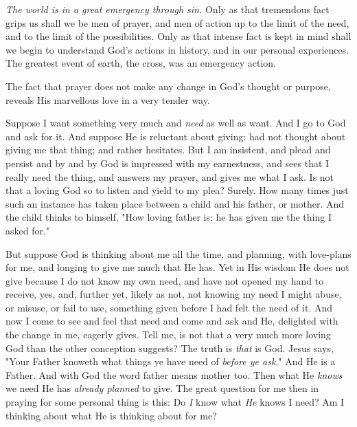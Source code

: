 \textit{The world is in a great emergency through sin.} Only as that tremendous
fact grips us shall we be men of prayer, and men of action up to the limit
of the need, and to the limit of the possibilities. Only as that intense
fact is kept in mind shall we begin to understand God's actions in
history, and in our personal experiences. The greatest event of earth, the
cross, was an emergency action.

The fact that prayer does not make any change in God's thought or
purpose, reveals His marvellous love in a very tender way.

Suppose I want something very much and \textit{need} as well as want. And I go to
God and ask for it. And suppose He is reluctant about giving: had not
thought about giving me that thing; and rather hesitates. But I am
insistent, and plead and persist and by and by God is impressed with my
earnestness, and sees that I really need the thing, and answers my prayer,
and gives me what I ask. Is not that a loving God so to listen and yield
to my plea? Surely. How many times just such an instance has taken place
between a child and his father, or mother. And the child thinks to
himself, "How loving father is; he has given me the thing I asked for."

But suppose God is thinking about me all the time, and planning, with
love-plans for me, and longing to give me much that He has. Yet in His
wisdom He does not give because I do not know my own need, and have not
opened my hand to receive, yes, and, further yet, likely as not, not
knowing my need I might abuse, or misuse, or fail to use, something given
before I had felt the need of it. And now I come to see and feel that need
and come and ask and He, delighted with the change in me, eagerly gives.
Tell me, is not that a very much more loving God than the other conception
suggests? The truth is \textit{that} is God. Jesus says, "Your Father knoweth
what things ye have need of \textit{before ye ask}." And He is a Father. And
with God the word father means mother too. Then what He \textit{knows} we need He
has \textit{already planned} to give. The great question for me then in praying
for some personal thing is this: Do \textit{I} know what \textit{He} knows I need? Am I
thinking about what He is thinking about for me?

